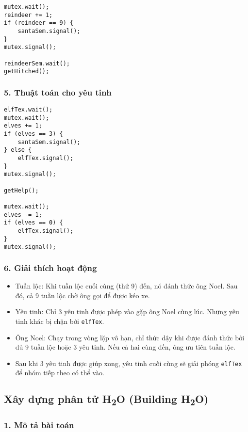 \begin{lstlisting}
mutex.wait();
reindeer += 1;
if (reindeer == 9) {
    santaSem.signal();
}
mutex.signal();

reindeerSem.wait();
getHitched();
\end{lstlisting}


\subsubsection*{5. Thuật toán cho yêu tinh}

\begin{lstlisting}
elfTex.wait();
mutex.wait();
elves += 1;
if (elves == 3) {
    santaSem.signal();
} else {
    elfTex.signal();
}
mutex.signal();

getHelp();

mutex.wait();
elves -= 1;
if (elves == 0) {
    elfTex.signal();
}
mutex.signal();
\end{lstlisting}

\subsubsection*{6. Giải thích hoạt động}

\begin{itemize}
  \item Tuần lộc: Khi tuần lộc cuối cùng (thứ 9) đến, nó đánh thức ông Noel. Sau đó, cả 9 tuần lộc chờ ông gọi để được kéo xe.
  \item Yêu tinh: Chỉ 3 yêu tinh được phép vào gặp ông Noel cùng lúc. Những yêu tinh khác bị chặn bởi \texttt{elfTex}.
  \item Ông Noel: Chạy trong vòng lặp vô hạn, chỉ thức dậy khi được đánh thức bởi đủ 9 tuần lộc hoặc 3 yêu tinh. Nếu cả hai cùng đến, ông ưu tiên tuần lộc.
  \item Sau khi 3 yêu tinh được giúp xong, yêu tinh cuối cùng sẽ giải phóng \texttt{elfTex} để nhóm tiếp theo có thể vào.
\end{itemize}

\newpage

\subsection{Xây dựng phân tử H\texorpdfstring{\textsubscript{2}}{2}O  (Building H\texorpdfstring{\textsubscript{2}}{2}O)}

\subsubsection*{1. Mô tả bài toán}

